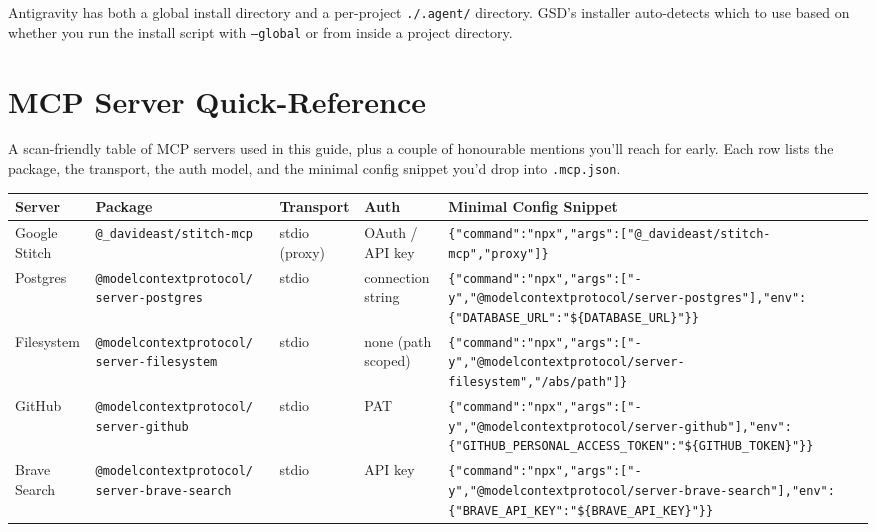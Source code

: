 \documentclass[11pt,letterpaper,openany]{book}
\begin{document}
\begin{gsdtip}
Antigravity has both a global install directory and a per-project
\texttt{./.agent/} directory. GSD's installer auto-detects which to use
based on whether you run the install script with \texttt{--global} or from
inside a project directory.
\end{gsdtip}

\chapter{MCP Server Quick-Reference}
\label{app:mcp-reference}

A scan-friendly table of MCP servers used in this guide, plus a couple of
honourable mentions you'll reach for early. Each row lists the package, the
transport, the auth model, and the minimal config snippet you'd drop into
\texttt{.mcp.json}.

\begin{small}
\begin{tabularx}{\textwidth}{@{}llllX@{}}
\toprule
\textbf{Server} & \textbf{Package} & \textbf{Transport} & \textbf{Auth} &
\textbf{Minimal Config Snippet} \\
\midrule
Google Stitch &
\texttt{@\_davideast/stitch-mcp} &
stdio (proxy) &
OAuth / API key &
\texttt{\{"command":"npx","args":["@\_davideast/stitch-mcp","proxy"]\}} \\
\addlinespace
Postgres &
\texttt{@modelcontextprotocol/} \texttt{server-postgres} &
stdio &
connection string &
\texttt{\{"command":"npx","args":["-y","@modelcontextprotocol/server-postgres"],"env":\{"DATABASE\_URL":"\$\{DATABASE\_URL\}"\}\}} \\
\addlinespace
Filesystem &
\texttt{@modelcontextprotocol/} \texttt{server-filesystem} &
stdio &
none (path scoped) &
\texttt{\{"command":"npx","args":["-y","@modelcontextprotocol/server-filesystem","/abs/path"]\}} \\
\addlinespace
GitHub &
\texttt{@modelcontextprotocol/} \texttt{server-github} &
stdio &
PAT &
\texttt{\{"command":"npx","args":["-y","@modelcontextprotocol/server-github"],"env":\{"GITHUB\_PERSONAL\_ACCESS\_TOKEN":"\$\{GITHUB\_TOKEN\}"\}\}} \\
\addlinespace
Brave Search &
\texttt{@modelcontextprotocol/} \texttt{server-brave-search} &
stdio &
API key &
\texttt{\{"command":"npx","args":["-y","@modelcontextprotocol/server-brave-search"],"env":\{"BRAVE\_API\_KEY":"\$\{BRAVE\_API\_KEY\}"\}\}} \\
\bottomrule
\end{tabularx}
\end{small}
\end{document}
